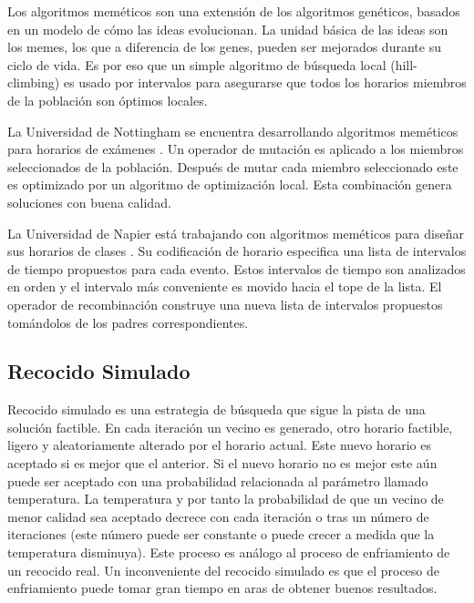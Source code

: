 Los algoritmos mem\'eticos son una extensión de los algoritmos gen\'eticos, basados en un modelo de cómo las ideas evolucionan. La unidad básica de las ideas son los memes, los que a diferencia de los genes, pueden ser mejorados durante su ciclo de vida. Es por eso que un simple algoritmo de búsqueda local (hill-climbing) es usado por intervalos
para asegurarse que todos los horarios miembros de la población son óptimos locales.

La Universidad de Nottingham se encuentra desarrollando algoritmos mem\'eticos para horarios de exámenes \cite{EK Burke and JP Newall and RF Weare}. Un operador de mutación es aplicado a los miembros seleccionados de la población. Despu\'es de mutar cada miembro seleccionado este es optimizado por un algoritmo de optimización local. Esta combinación genera soluciones con buena calidad.

La Universidad de Napier está trabajando con algoritmos mem\'eticos para diseñar sus horarios de clases \cite{B Paechter and A Cumming and MG Norman and H Luchian}. Su codificación de horario especifica una lista de intervalos de tiempo propuestos para cada evento. Estos intervalos de tiempo son analizados en orden y el intervalo más conveniente es movido hacia el tope de la lista. El operador de recombinación construye una nueva lista de intervalos propuestos tomándolos de los padres correspondientes.

\subsection{Recocido Simulado}

Recocido simulado es una estrategia de búsqueda que sigue la pista de una solución factible. En cada iteración un vecino es generado, otro horario factible, ligero y aleatoriamente alterado por el horario actual. Este nuevo horario es aceptado si es mejor que el anterior. Si el nuevo horario no es mejor este aún puede ser aceptado con una probabilidad relacionada al parámetro llamado temperatura. La temperatura y por tanto la probabilidad de que un vecino de menor calidad sea aceptado decrece con cada iteración o tras un número de iteraciones (este número puede ser constante o puede crecer a medida que la temperatura disminuya). Este proceso es análogo al proceso de enfriamiento de un recocido real. Un inconveniente del recocido simulado es que el proceso de enfriamiento puede tomar gran tiempo en aras de obtener buenos resultados.

